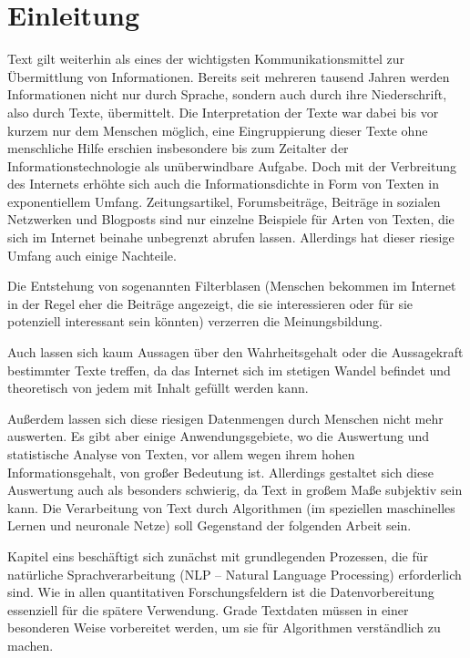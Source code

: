 \documentclass[a4paper,12pt]{article}
\begin{document}
\pagestyle{fancy}
\fancyhf{}
\fancyhead[RO]{\textbf{\thepage}}
\tableofcontents

\newpage 
\listoffigures
\newpage
\listoftables
\newpage
\onehalfspacing



\section{Einleitung}

Text gilt weiterhin als eines der wichtigsten Kommunikationsmittel zur Übermittlung von Informationen. Bereits seit mehreren tausend Jahren werden Informationen nicht nur durch Sprache, sondern auch durch ihre Niederschrift, also durch Texte, übermittelt. Die Interpretation der Texte war dabei bis vor kurzem nur dem Menschen möglich, eine Eingruppierung dieser Texte ohne menschliche Hilfe erschien insbesondere bis zum Zeitalter der Informationstechnologie als unüberwindbare Aufgabe. Doch mit der Verbreitung des Internets erhöhte sich auch die Informationsdichte in Form von Texten in exponentiellem Umfang. 
Zeitungsartikel, Forumsbeiträge, Beiträge in sozialen Netzwerken und Blogposts sind nur einzelne Beispiele für Arten von Texten, die sich im Internet beinahe unbegrenzt abrufen lassen. Allerdings hat dieser riesige Umfang auch einige Nachteile. 

Die Entstehung von sogenannten Filterblasen (Menschen bekommen im Internet in der Regel eher die Beiträge angezeigt, die sie interessieren oder für sie potenziell interessant sein könnten) verzerren die Meinungsbildung. 

Auch lassen sich kaum Aussagen über den Wahrheitsgehalt oder die Aussagekraft bestimmter Texte treffen, da das Internet sich im stetigen Wandel befindet und theoretisch von jedem mit Inhalt gefüllt werden kann. 

Außerdem lassen sich diese riesigen Datenmengen durch Menschen nicht mehr auswerten. Es gibt aber einige Anwendungsgebiete, wo die Auswertung und statistische Analyse von Texten, vor allem wegen ihrem hohen Informationsgehalt, von großer Bedeutung ist. Allerdings gestaltet sich diese Auswertung auch als besonders schwierig, da Text in großem Maße subjektiv sein kann. 
Die Verarbeitung von Text durch Algorithmen (im speziellen maschinelles Lernen und neuronale Netze) soll Gegenstand der folgenden Arbeit sein. 

Kapitel eins beschäftigt sich zunächst mit grundlegenden Prozessen, die für natürliche Sprachverarbeitung (NLP – Natural Language Processing) erforderlich sind. Wie in allen quantitativen Forschungsfeldern ist die Datenvorbereitung essenziell für die spätere Verwendung. Grade Textdaten müssen in einer besonderen Weise vorbereitet werden, um sie für Algorithmen verständlich zu machen. 
\end{document}
